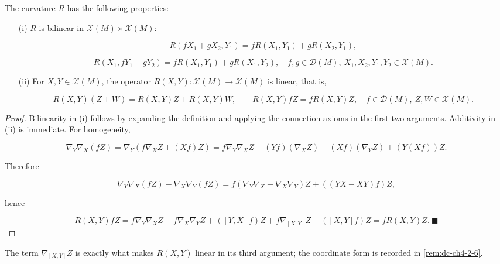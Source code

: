 \begin{proposition}
  \label{prop:dc-ch4-2-2}
  \leanok
  The curvature $R$ has the following properties:
  \begin{enumerate}
  \item[(i)] $R$ is bilinear in $\mathcal{X}(M)\times\mathcal{X}(M)$:
  
  $$
  R(fX_1+gX_2,Y_1)=fR(X_1,Y_1)+gR(X_2,Y_1),
  $$
  
  $$
  R(X_1,fY_1+gY_2)=fR(X_1,Y_1)+gR(X_1,Y_2),\quad f,g\in\mathcal{D}(M),\ X_1,X_2,Y_1,Y_2\in\mathcal{X}(M).
  $$
  
  \item[(ii)] For $X,Y\in\mathcal{X}(M)$, the operator
  $R(X,Y):\mathcal{X}(M)\to\mathcal{X}(M)$ is linear, that is,
  
  $$
  R(X,Y)(Z+W)=R(X,Y)Z+R(X,Y)W,\qquad R(X,Y)fZ=fR(X,Y)Z,
  \quad f\in\mathcal{D}(M),\ Z,W\in\mathcal{X}(M).
  $$
  \end{enumerate}
\end{proposition}
\begin{proof}
  \leanok
  \sketch
  Bilinearity in (i) follows by expanding the definition and applying the
  connection axioms in the first two arguments. Additivity in (ii) is immediate.
  For homogeneity,
  
  $$
  \nabla_Y\nabla_X(fZ)=\nabla_Y(f\nabla_X Z+(Xf)Z)=f\nabla_Y\nabla_X Z+(Yf)(\nabla_X Z)+(Xf)(\nabla_Y Z)+(Y(Xf))Z.
  $$
  
  Therefore
  
  $$
  \nabla_Y\nabla_X(fZ)-\nabla_X\nabla_Y(fZ)=f(\nabla_Y\nabla_X-\nabla_X\nabla_Y)Z+((YX-XY)f)Z,
  $$
  
  hence
  
  $$
  R(X,Y)fZ=f\nabla_Y\nabla_X Z-f\nabla_X\nabla_Y Z+([Y,X]f)Z+f\nabla_{[X,Y]}Z+([X,Y]f)Z=fR(X,Y)Z.\ \blacksquare
  $$
\end{proof}

\begin{remark}[Remark 2.3]
  \label{rem:dc-ch4-2-3}
  The term $\nabla_{[X,Y]}Z$ is exactly what makes $R(X,Y)$ linear in its
  third argument; the coordinate form is recorded in \cref{rem:dc-ch4-2-6}.
\end{remark}

